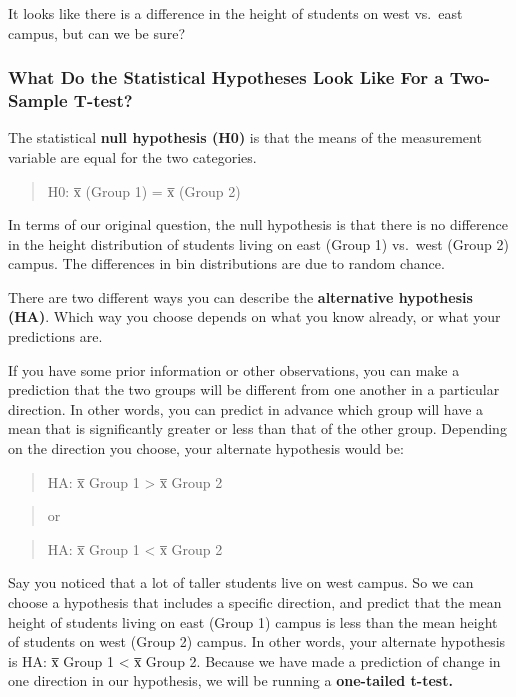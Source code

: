 \documentclass[
]{book}
\begin{document}
It looks like there is a difference in the height of students on west vs.~east campus, but can we be sure?

\hypertarget{what-do-the-statistical-hypotheses-look-like-for-a-two-sample-t-test}{%
\subsubsection{What Do the Statistical Hypotheses Look Like For a Two-Sample T-test?}\label{what-do-the-statistical-hypotheses-look-like-for-a-two-sample-t-test}}

The statistical \textbf{null hypothesis (H0)} is that the means of the measurement variable are equal for the two categories.

\begin{quote}
H0: x̅ (Group 1) = x̅ (Group 2)
\end{quote}

In terms of our original question, the null hypothesis is that there is no difference in the height distribution of students living on east (Group 1) vs.~west (Group 2) campus. The differences in bin distributions are due to random chance.

There are two different ways you can describe the \textbf{alternative hypothesis (HA)}. Which way you choose depends on what you know already, or what your predictions are.

If you have some prior information or other observations, you can make a prediction that the two groups will be different from one another in a particular direction. In other words, you can predict in advance which group will have a mean that is significantly greater or less than that of the other group. Depending on the direction you choose, your alternate hypothesis would be:

\begin{quote}
HA: x̅ Group 1 \textgreater{} x̅ Group 2
\end{quote}

\begin{quote}
or
\end{quote}

\begin{quote}
HA: x̅ Group 1 \textless{} x̅ Group 2
\end{quote}

Say you noticed that a lot of taller students live on west campus. So we can choose a hypothesis that includes a specific direction, and predict that the mean height of students living on east (Group 1) campus is less than the mean height of students on west (Group 2) campus. In other words, your alternate hypothesis is HA: x̅ Group 1 \textless{} x̅ Group 2.
Because we have made a prediction of change in one direction in our hypothesis, we will be running a \textbf{one-tailed t-test.}
\end{document}
